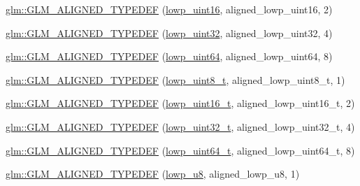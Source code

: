 \begin{DoxyCompactItemize}
\item 
\hyperlink{group__gtx__type__aligned_ga1246094581af624aca6c7499aaabf801}{glm\+::\+G\+L\+M\+\_\+\+A\+L\+I\+G\+N\+E\+D\+\_\+\+T\+Y\+P\+E\+D\+EF} (\hyperlink{group__gtc__type__precision_ga9b8409887319f62f06e664f6ca121b9d}{lowp\+\_\+uint16}, aligned\+\_\+lowp\+\_\+uint16, 2)
\item 
\hyperlink{group__gtx__type__aligned_ga7a5009a1d0196bbf21dd7518f61f0249}{glm\+::\+G\+L\+M\+\_\+\+A\+L\+I\+G\+N\+E\+D\+\_\+\+T\+Y\+P\+E\+D\+EF} (\hyperlink{group__gtc__type__precision_gaf11e85af414720b4cd12bd57b3a81e68}{lowp\+\_\+uint32}, aligned\+\_\+lowp\+\_\+uint32, 4)
\item 
\hyperlink{group__gtx__type__aligned_ga45213fd18b3bb1df391671afefe4d1e7}{glm\+::\+G\+L\+M\+\_\+\+A\+L\+I\+G\+N\+E\+D\+\_\+\+T\+Y\+P\+E\+D\+EF} (\hyperlink{group__gtc__type__precision_gacf666a9d9b309c4615c7a4f2ab0be289}{lowp\+\_\+uint64}, aligned\+\_\+lowp\+\_\+uint64, 8)
\item 
\hyperlink{group__gtx__type__aligned_ga0ba26b4e3fd9ecbc25358efd68d8a4ca}{glm\+::\+G\+L\+M\+\_\+\+A\+L\+I\+G\+N\+E\+D\+\_\+\+T\+Y\+P\+E\+D\+EF} (\hyperlink{group__gtc__type__precision_ga0910ef24195d1b8b26e34d73148c0c45}{lowp\+\_\+uint8\+\_\+t}, aligned\+\_\+lowp\+\_\+uint8\+\_\+t, 1)
\item 
\hyperlink{group__gtx__type__aligned_gaf2b58f5fb6d4ec8ce7b76221d3af43e1}{glm\+::\+G\+L\+M\+\_\+\+A\+L\+I\+G\+N\+E\+D\+\_\+\+T\+Y\+P\+E\+D\+EF} (\hyperlink{group__gtc__type__precision_ga9a71176a4e5bc61951f9e9197d9c80e1}{lowp\+\_\+uint16\+\_\+t}, aligned\+\_\+lowp\+\_\+uint16\+\_\+t, 2)
\item 
\hyperlink{group__gtx__type__aligned_gadc246401847dcba155f0699425e49dcd}{glm\+::\+G\+L\+M\+\_\+\+A\+L\+I\+G\+N\+E\+D\+\_\+\+T\+Y\+P\+E\+D\+EF} (\hyperlink{group__gtc__type__precision_ga9f8cb602a358e1f48bda2682cf051f0c}{lowp\+\_\+uint32\+\_\+t}, aligned\+\_\+lowp\+\_\+uint32\+\_\+t, 4)
\item 
\hyperlink{group__gtx__type__aligned_gaace64bddf51a9def01498da9a94fb01c}{glm\+::\+G\+L\+M\+\_\+\+A\+L\+I\+G\+N\+E\+D\+\_\+\+T\+Y\+P\+E\+D\+EF} (\hyperlink{group__gtc__type__precision_gabf3069d4f188557a87b1d7f35eb0a270}{lowp\+\_\+uint64\+\_\+t}, aligned\+\_\+lowp\+\_\+uint64\+\_\+t, 8)
\item 
\hyperlink{group__gtx__type__aligned_gad7bb97c29d664bd86ffb1bed4abc5534}{glm\+::\+G\+L\+M\+\_\+\+A\+L\+I\+G\+N\+E\+D\+\_\+\+T\+Y\+P\+E\+D\+EF} (\hyperlink{group__gtc__type__precision_gae63f942c49a30dbf266b2f13f3efe257}{lowp\+\_\+u8}, aligned\+\_\+lowp\+\_\+u8, 1)
\item 

\end{DoxyCompactItemize}
